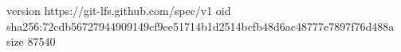 version https://git-lfs.github.com/spec/v1
oid sha256:72cdb56727944909149cf9ee51714b1d2514bcfb48d6ac48777e7897f76d488a
size 87540
